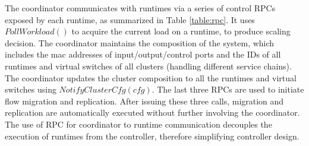 The coordinator communicates with runtimes via a series of control RPCs exposed by each runtime, as summarized in Table \ref{table:rpc}. It uses $PollWorkload()$ to acquire the current load on a runtime, to produce scaling decision. The coordinator maintains the composition of the system, which includes the mac addresses of input/output/control ports and the IDs of all runtimes and virtual switches of all clusters (handling different service chains). The coordinator updates the cluster composition to all the runtimes and virtual switches using $NotifyClusterCfg(cfg)$. %
The last three RPCs are used to initiate flow migration and replication. After issuing these three calls, migration and replication are automatically executed without further involving the coordinator. The use of RPC for coordinator to runtime communication decouples the execution of runtimes from the controller, therefore simplifying controller design.




